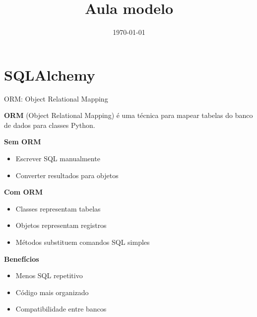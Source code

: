 \documentclass{beamer}
\title{Aula modelo}
\date{\today}
\begin{document}
    


\sumario

\section{SQLAlchemy}


\begin{frame}{ORM: Object Relational Mapping}

\textbf{ORM} (Object Relational Mapping) é uma técnica para mapear tabelas do banco de dados para classes Python.

\vspace{0.4cm}

\textbf{Sem ORM}

\begin{itemize}
    \item Escrever SQL manualmente
    \item Converter resultados para objetos
\end{itemize}

\vspace{0.3cm}

\textbf{Com ORM}

\begin{itemize}
    \item Classes representam tabelas
    \item Objetos representam registros
    \item Métodos substituem comandos SQL simples
\end{itemize}

\vspace{0.4cm}

\textbf{Benefícios}

\begin{itemize}
    \item Menos SQL repetitivo
    \item Código mais organizado
    \item Compatibilidade entre bancos
\end{itemize}

\end{frame}
\end{document}
